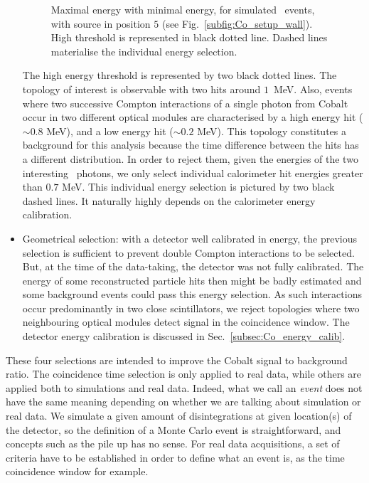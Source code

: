 \begin{itemize}
\begin{figure}[h]
    \caption{Maximal energy with minimal energy, for simulated \Co\ events, with source in position $5$ (see Fig.~\ref{subfig:Co_setup_wall}).
      High threshold is represented in black dotted line.
      Dashed lines materialise the individual energy selection.
      \label{fig:Co_energy_cut}}
  \end{figure}
  The high energy threshold is represented by two black dotted lines.
  The topology of interest is observable with two hits around $1$~MeV.
  Also, events where two successive Compton interactions of a single photon from Cobalt occur in two different optical modules are characterised by a high energy hit ($\sim 0.8$ MeV), and a low energy hit ($\sim 0.2$ MeV).
  This topology constitutes a background for this analysis because the time difference between the hits has a different distribution.
  In order to reject them, given the energies of the two interesting \Co\ photons, we only select individual calorimeter hit energies greater than $0.7$ MeV.
  This individual energy selection is pictured by two black dashed lines.
  It naturally highly depends on the calorimeter energy calibration.
\item Geometrical selection:
  with a detector well calibrated in energy, the previous selection is sufficient to prevent double Compton interactions to be selected.
  But, at the time of the data-taking, the detector was not fully calibrated.
  The energy of some reconstructed particle hits then might be badly estimated and some background events could pass this energy selection.
  As such interactions occur predominantly in two close scintillators, we reject topologies where two neighbouring optical modules detect signal in the coincidence window.
  The detector energy calibration is discussed in Sec.~\ref{subsec:Co_energy_calib}.
\end{itemize}
These four selections are intended to improve the Cobalt signal to background ratio.
The coincidence time selection is only applied to real data, while others are applied both to simulations and real data.
Indeed, what we call an \emph{event} does not have the same meaning depending on whether we are talking about simulation or real data.
We simulate a given amount of disintegrations at given location(s) of the detector, so the definition of a Monte Carlo event is straightforward, and concepts such as the pile up has no sense.
For real data acquisitions, a set of criteria have to be established in order to define what an event is, as the time coincidence window for example.

